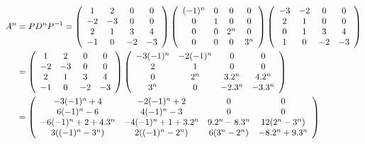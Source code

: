 {\begin{enumerate}
{\begin{align*}\ensuremath
A^n&=PD^nP^{-1}=\left(
\begin{array}{cccc}
1&2&0&0\\
-2&-3&0&0\\
2&1&3&4\\
-1&0&-2&-3
\end{array}
\right)\left(
\begin{array}{cccc}
(-1)^n&0&0&0\\
0&1&0&0\\
0&0&2^n&0\\
0&0&0&3^n
\end{array}
\right)\left(
\begin{array}{cccc}
-3&-2&0&0\\
2&1&0&0\\
0&1&3&4\\
1&0&-2&-3
\end{array}
\right)
\\
 &=\left(
\begin{array}{cccc}
1&2&0&0\\
-2&-3&0&0\\
2&1&3&4\\
-1&0&-2&-3
\end{array}
\right)\left(
\begin{array}{cccc}
-3(-1)^n&-2(-1)^n&0&0\\
2&1&0&0\\
0&2^n&3.2^n&4.2^n\\
3^n&0&-2.3^n&-3.3^n
\end{array}
\right)\\
 &=\left(
\begin{array}{cccc}
-3(-1)^n+4&-2(-1)^n+2&0&0\\
6(-1)^n-6&4(-1)^n-3&0&0\\
-6(-1)^n+2+4.3^n&-4(-1)^n+1+3.2^n&9.2^n-8.3^n&12(2^n-3^n)\\
3((-1)^n-3^n)&2((-1)^n-2^n)&6(3^n-2^n)&-8.2^n+9.3^n
\end{array}
\right)
\end{align*}}
\end{enumerate}
}